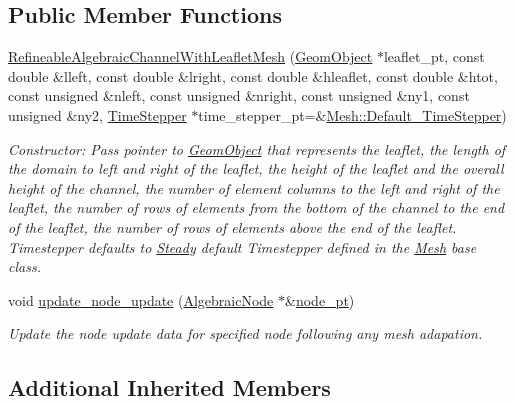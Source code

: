 \subsection*{Public Member Functions}
\begin{DoxyCompactItemize}
\item 
\hyperlink{classoomph_1_1RefineableAlgebraicChannelWithLeafletMesh_a6f67c948b27ed9350e57b2c92b573610}{Refineable\+Algebraic\+Channel\+With\+Leaflet\+Mesh} (\hyperlink{classoomph_1_1GeomObject}{Geom\+Object} $\ast$leaflet\+\_\+pt, const double \&lleft, const double \&lright, const double \&hleaflet, const double \&htot, const unsigned \&nleft, const unsigned \&nright, const unsigned \&ny1, const unsigned \&ny2, \hyperlink{classoomph_1_1TimeStepper}{Time\+Stepper} $\ast$time\+\_\+stepper\+\_\+pt=\&\hyperlink{classoomph_1_1Mesh_a12243d0fee2b1fcee729ee5a4777ea10}{Mesh\+::\+Default\+\_\+\+Time\+Stepper})
\begin{DoxyCompactList}\small\item\em Constructor\+: Pass pointer to \hyperlink{classoomph_1_1GeomObject}{Geom\+Object} that represents the leaflet, the length of the domain to left and right of the leaflet, the height of the leaflet and the overall height of the channel, the number of element columns to the left and right of the leaflet, the number of rows of elements from the bottom of the channel to the end of the leaflet, the number of rows of elements above the end of the leaflet. Timestepper defaults to \hyperlink{classoomph_1_1Steady}{Steady} default Timestepper defined in the \hyperlink{classoomph_1_1Mesh}{Mesh} base class. \end{DoxyCompactList}\item 
void \hyperlink{classoomph_1_1RefineableAlgebraicChannelWithLeafletMesh_a8ee7168fbb84bb87880a2590dd52eaa8}{update\+\_\+node\+\_\+update} (\hyperlink{classoomph_1_1AlgebraicNode}{Algebraic\+Node} $\ast$\&\hyperlink{classoomph_1_1AlgebraicMesh_aedeebbe95d2f8e67e9939cecd1be3933}{node\+\_\+pt})
\begin{DoxyCompactList}\small\item\em Update the node update data for specified node following any mesh adapation. \end{DoxyCompactList}\end{DoxyCompactItemize}
\subsection*{Additional Inherited Members}


